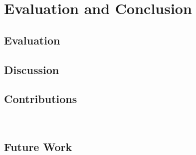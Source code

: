 \chapter{Evaluation and Conclusion}
\label{cha:evaluationAndConclusion}

\section{Evaluation}
\label{sec:Evaluation}

\section{Discussion}
\label{sec:Discussion}

\section{Contributions}~\label{cont}
\label{sec:Contributions}

\section{Future Work}
\label{sec:futureWork}
